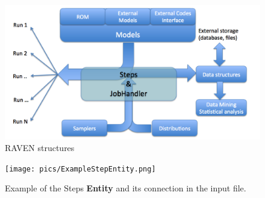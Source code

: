 \begin{figure}[h!]
  \includegraphics[width=\textwidth]{pics/ravenStructure.png}
  \caption{RAVEN structures}
  \label{fig:ravenStructure}
\end{figure}
\begin{figure}[h!]
  \texttt{[image: pics/ExampleStepEntity.png]}
  \caption{Example of the Steps \textbf{Entity}  and its connection in the input file.}
  \label{fig:ExampleStepEntity}
\end{figure}
